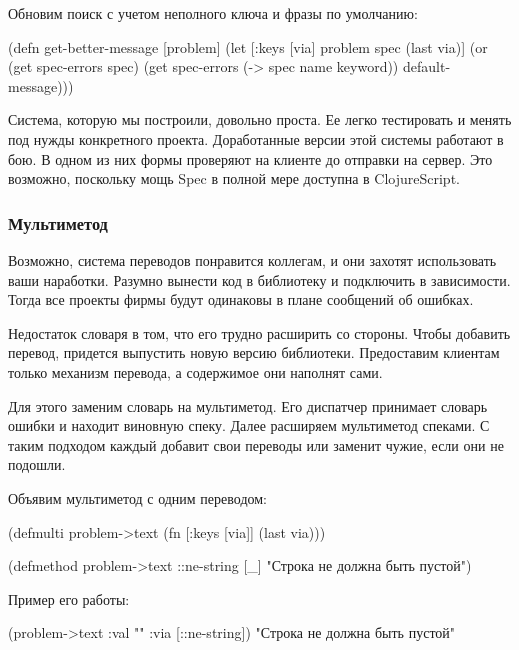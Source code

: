 \noindent
Обновим поиск с учетом неполного ключа и фразы по умолчанию:

\begin{english}
  \begin{clojure}
(defn get-better-message
  [problem]
  (let [{:keys [via]} problem
        spec (last via)]
    (or (get spec-errors spec)
        (get spec-errors (-> spec name keyword))
        default-message)))
  \end{clojure}
\end{english}

Система, которую мы построили, довольно проста. Ее легко тестировать и менять
под нужды конкретного проекта. Доработанные версии этой системы работают в
бою. В одном из них формы проверяют на клиенте до отправки на сервер. Это
возможно, поскольку мощь Spec в полной мере доступна в ClojureScript.

\subsubsection{Мультиметод}

Возможно, система переводов понравится коллегам, и они захотят использовать ваши
наработки. Разумно вынести код в библиотеку и подключить в зависимости. Тогда
все проекты фирмы будут одинаковы в плане сообщений об ошибках.

Недостаток словаря в том, что его трудно расширить со стороны. Чтобы добавить
перевод, придется выпустить новую версию библиотеки. Предоставим клиентам только
механизм перевода, а содержимое они наполнят сами.

Для этого заменим словарь на мультиметод. Его диспатчер принимает словарь ошибки
и находит виновную спеку. Далее расширяем мультиметод спеками. С таким подходом
каждый добавит свои переводы или заменит чужие, если они не подошли.

Объявим мультиметод с одним переводом:

  \begin{clojure}
(defmulti problem->text
  (fn [{:keys [via]}]
    (last via)))

(defmethod problem->text ::ne-string [_]
  "Строка не должна быть пустой")
  \end{clojure}

Пример его работы:

  \begin{clojure}
(problem->text {:val "" :via [::ne-string]})
"Строка не должна быть пустой"
  \end{clojure}


